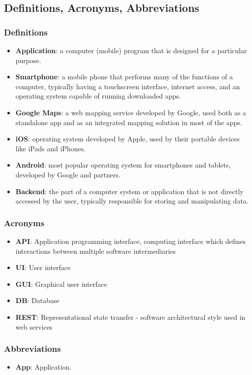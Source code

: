 \newpage

\subsection{Definitions, Acronyms, Abbreviations}
\subsubsection{Definitions}
\begin{itemize} 
	\item \textbf{Application}: a computer (mobile) program that is designed for a particular purpose. 
	\item \textbf{Smartphone}: a mobile phone that performs many of the functions of a computer, typically having a touchscreen interface, internet access, and an operating system capable of running downloaded apps. 
	\item \textbf{Google Maps}: a web mapping service developed by Google, used both as a standalone app and as an integrated mapping solution in most of the apps.
	\item \textbf{iOS}: operating system developed by Apple, used by their portable devices like iPads and iPhones.
	\item \textbf{Android}: most popular operating system for smartphones and tablets, developed by Google and partners.
	\item \textbf{Backend}: the part of a computer system or application that is not directly accessed by the user, typically responsible for storing and manipulating data.
\end{itemize}
\subsubsection{Acronyms}
\begin{itemize}
	\item \textbf{API}: Application programming interface, computing interface which defines interactions between multiple software intermediaries 
	\item \textbf{UI}: User interface	
	\item \textbf{GUI}: Graphical user interface
	\item \textbf{DB}: Database
	\item \textbf{REST}: Representational state transfer - software architectural style used in web services
\end{itemize}
\subsubsection{Abbreviations}
\begin{itemize}
	\item \textbf{App}: Application.
\end{itemize}

